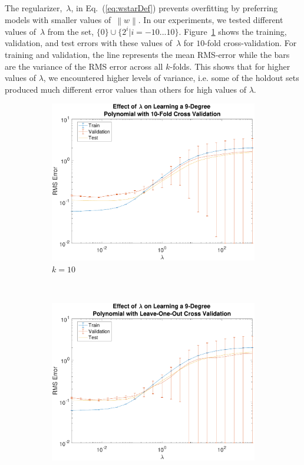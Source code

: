 \documentclass{report}
\newcommand{\eref}[1]{(\ref{#1})}
\newcommand{\norm}[1]{\left\lVert#1\right\rVert}
\begin{document}
  The regularizer,~$\lambda$, in Eq.~\eref{eq:wstarDef} prevents overfitting by preferring models with smaller values of~$\norm{w}$.  In our experiments, we tested different values of~$\lambda$ from the set, ${\{0\} \cup \{2^{i} | i=-10...10\}}$.  Figure~\ref{fig:tenFoldCv} shows the training, validation, and test errors with these values of~$\lambda$ for $10$-fold cross-validation.  For training and validation, the line represents the mean RMS-error while the bars are the variance of the RMS error across all $k$-folds.  This shows that for higher values of $\lambda$, we encountered higher levels of variance, i.e. some of the holdout sets produced much different error values than others for high values of $\lambda$.
  
  
  \begin{figure}
    \centering
    \begin{subfigure}[t]{0.45\textwidth}
      \centering
      \includegraphics[width=1.0\textwidth]{lambda_sweep_k=10_degree=9.pdf}
      \caption{$k=10$}\label{fig:tenFoldCv}
    \end{subfigure}%
    ~ 
    \begin{subfigure}[t]{0.45\textwidth}
      \centering
      \includegraphics[width=1.0\textwidth]{lambda_sweep_leave_one_out_degree=9.pdf}

\end{subfigure}
\end{figure}
\end{document}
